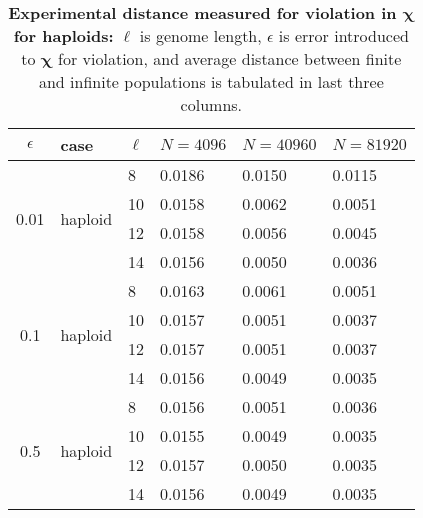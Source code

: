 \begin{table}[ht]
\caption{\textbf{Experimental distance measured for violation in $\bm{\chi}$ for haploids:} $\ell$ is genome length, 
$\epsilon$ is error introduced to $\bm{\chi}$ for violation, and average distance between finite and 
infinite populations is tabulated in last three columns.}
\centering
\begin{tabularx}{0.75\textwidth}{ c *{5}{X}}
\toprule
$\epsilon$ & case & $\ell$ & $N = 4096$ & $N = 40960$ & $N = 81920$  \\
\midrule
\multirow{4}{*}{0.01} & \multirow{4}{*}{haploid} 	& 8 & 0.0186	&  0.0150 	& 0.0115 \\
		      &   				& 10 & 0.0158	&  0.0062 	& 0.0051 \\ 
		      & 			 	& 12 & 0.0158	&  0.0056	& 0.0045 \\
		      &  	 			& 14 & 0.0156	&  0.0050	& 0.0036 \\ 
		      \midrule
\multirow{4}{*}{0.1}  & \multirow{4}{*}{haploid} 	& 8 & 0.0163	& 0.0061 	& 0.0051 \\
		      &   				& 10 & 0.0157	&  0.0051	& 0.0037 \\	
		      & 				& 12 & 0.0157	&  0.0051	& 0.0037 \\	
		      &  	 			& 14 & 0.0156	&  0.0049	& 0.0035 \\
		      \midrule
\multirow{4}{*}{0.5}  & \multirow{4}{*}{haploid} 	& 8 & 0.0156	&  0.0051	& 0.0036 \\
		      &   				& 10 & 0.0155	&  0.0049	& 0.0035 \\
		      & 				& 12 & 0.0157	&  0.0050	& 0.0035 \\
		      &  	 			& 14 & 0.0156	&  0.0049	& 0.0035 \\      
\bottomrule
\end{tabularx}
\label{distanceChiHap}
\end{table} 



